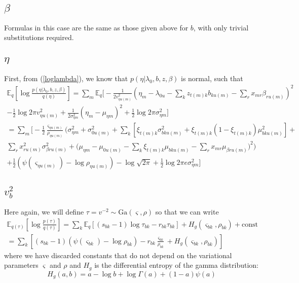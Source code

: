 \documentclass[11pt]{article}
\begin{document}
\subsection{$\beta$}
Formulas in this case are the same as those given above for $b$, with only trivial substitutions required.

\subsection{$\eta$}
First, from (\ref{loglambda}), we know that $p(\eta|\lambda_0, b, z, \beta)$ is normal, such that
\begin{multline}
    \mathbb{E}_{q}\left[ \log \frac{p(\eta|\lambda_0, b, z, \beta)}{q(\eta)}\right] = 
    \sum_m \mathbb{E}_q \Bigg[
    -\frac{1}{2 v^2_{\eta u(m)}} 
        \left(
        \eta_m - \lambda_{0u} - \sum_k z_{t(m) k} b_{k u(m)} - 
        \sum_r x_{mr} \beta_{r u(m)} 
        \right)^2  \\
    -\frac{1}{2} \log 2\pi v^2_{\eta u(m)}
    + \frac{1}{2\sigma^2_{\eta m}} (\eta_m - \mu_{\eta m})^2 + 
    \frac{1}{2} \log 2\pi \sigma^2_{\eta m}
    \Bigg] \\
    = \sum_m \Bigg[ -\frac{1}{2}\frac{\varsigma_{\eta u(m)}}{\rho_{\eta u(m)}} 
    \Bigg(
        \sigma^2_{\eta m} + \sigma^2_{0 u(m)} + 
        \sum_k \left[ \xi_{t(m) k} \sigma^2_{b k u(m)} +
        \xi_{t(m) k} (1 - \xi_{t(m) k}) \mu^2_{bk u(m)}\right] + \\
        \sum_r x^2_{r u(m)} \sigma^2_{\beta r u(m)}
    +
    \Big(
    \mu_{\eta m} - \mu_{0 u(m)} - \sum_k \xi_{t(m) k} \mu_{b k u(m)} 
    - \sum_r x_{mr} \mu_{\beta r u(m)}
    \Big)^2 \Bigg)  \\
    + \frac{1}{2}(\psi(\varsigma_{\eta u(m)}) - \log \rho_{\eta u(m)}) - \log \sqrt{2\pi}
    + \frac{1}{2} \log 2\pi e \sigma^2_{\eta m}
    \Bigg]
\end{multline}

\subsection{$v^2_b$}
Here again, we will define $\tau = v^{-2} \sim \mathrm{Ga}(\varsigma, \rho)$ so that we can write
\begin{multline}
    \mathbb{E}_{q(\tau)}\left[\log \frac{p(\tau)}{q(\tau)}\right] =
    \sum_k \mathbb{E}_q \left[
    (s_{bk} - 1) \log \tau_{bk} - r_{bk} \tau_{bk} \right]  
    + H_g(\varsigma_{bk}, \rho_{bk})    
    + \mathrm{const} \\
    = \sum_k \left[ 
    (s_{bk} - 1) (\psi(\varsigma_{bk}) - \log \rho_{bk}) 
    - r_{bk} \frac{\varsigma_{bk}}{\rho_{bk}} + H_g(\varsigma_{bk}, \rho_{bk})
    \right]
\end{multline}
where we have discarded constants that do not depend on the variational parameters $\varsigma$ and $\rho$ and $H_g$ is the differential entropy of the gamma distribution:
\begin{equation}
    H_g(a, b) = a - \log b + \log \Gamma(a) + (1 - a)\psi(a)
\end{equation}
\end{document}
